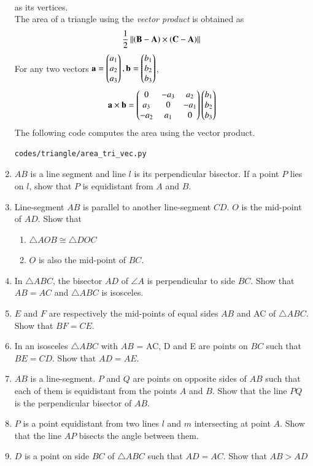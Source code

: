 \begin{enumerate}[label=\arabic*.,ref=\thesubsection.\theenumi]
\begin{align}
\end{align}
%
as its vertices.
\\
\solution The area of a triangle using the {\em vector product} is obtained as
\begin{align}
\frac{1}{2}\left\lVert\left(\mathbf{B}-\mathbf{A}\right)\times \left(\mathbf{C}-\mathbf{A}\right)\right\rVert
\end{align}
%
For any two vectors $\mathbf{a}=\begin{pmatrix}a_1\\a_2\\a_3\end{pmatrix}, \mathbf{b}=\begin{pmatrix}b_1\\b_2\\b_3\end{pmatrix}$, 
\begin{align}
\label{eq:tri_cross_prod}
\mathbf{a}\times \mathbf{b} = \begin{pmatrix}0 & -a_3 & a_2 \\ a_3 & 0 & -a_1 \\ -a_2 & a_1 & 0\end{pmatrix}\begin{pmatrix}b_1\\b_2\\b_3\end{pmatrix}
\end{align}
%
The following code computes the area using the vector product.
%
\begin{lstlisting}
codes/triangle/area_tri_vec.py
\end{lstlisting}
%
%
\item $AB$ is a line segment and line $l$ is its perpendicular bisector. If a point $P$ lies on $l$, show that $P$ is equidistant from $A$ and $B$.
\item Line-segment $AB$ is parallel to another line-segment $CD$. $O$ is the mid-point of $AD$. Show that 
\begin{enumerate}
\item  $\triangle AOB \cong \triangle DOC$ 
\item  $O$ is also the mid-point of $BC$.
\end{enumerate}
%
\item In $\triangle ABC$, the bisector $AD$ of $\angle  A$ is perpendicular to side $BC$. Show that $AB = AC$ and $\triangle ABC$ is isosceles.
\item $E$ and $F$ are respectively the mid-points of equal sides $AB$ and AC of $\triangle ABC$. Show that $BF = CE$. 
\item In an isosceles $\triangle ABC$ with $AB$ = AC, D and E are points on $BC$ such that $BE = CD$. Show that $AD = AE$. 
%
\item $AB$ is a line-segment. $P$ and $Q$ are points on opposite sides of $AB$ such that each of them is equidistant from the points $A$ and $B$. Show that the line $PQ $ is the perpendicular bisector of $AB$.
%
\item $P$ is a point equidistant from two lines $l$ and $m$ intersecting at point $A$.  Show that the line  $AP$  bisects the angle between them.
%
\item $D$ is a point on side $BC$ of $\triangle  ABC$ such that $AD = AC$. Show that $AB > AD$


\end{enumerate}
